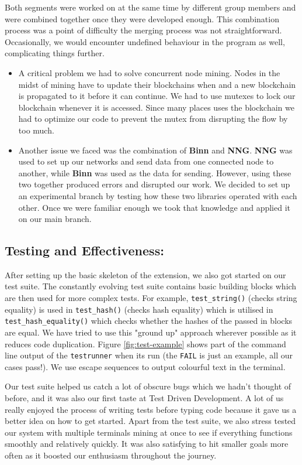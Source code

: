 \documentclass[a4paper]{article}
\begin{document}
Both segments were worked on at the same time by different group members and were combined together once they were developed enough. This combination process was a point of difficulty the merging process was not straightforward. Occasionally, we would encounter undefined behaviour in the program as well, complicating things further.
\begin{itemize}

\item A critical problem we had to solve concurrent node mining. Nodes in the midst of mining have to update their blockchains when and a new blockchain is propagated to it before it can continue. We had to use mutexes to lock our blockchain whenever it is accessed. Since many places uses the blockchain we had to optimize our code to prevent the mutex from disrupting the flow by too much.

\item Another issue we faced was the combination of \textbf{Binn} and \textbf{NNG}. \textbf{NNG} was used to set up our networks and send data from one connected node to another, while \textbf{Binn} was used as the data for sending. However, using these two together produced errors and disrupted our work. We decided to set up an experimental branch by testing how these two libraries operated with each other. Once we were familiar enough we took that knowledge and applied it on our main branch.
\end{itemize}
\subsection{Testing and Effectiveness:}
After setting up the basic skeleton of the extension, we also got started on our test suite. The constantly evolving test suite contains basic building blocks which are then used for more complex tests. For example, \verb|test_string()| (checks string equality) is used in \verb|test_hash()| (checks hash equality) which is utilised in \verb|test_hash_equality()| which checks whether the hashes of the passed in blocks are equal. We have tried to use this "ground up" approach wherever possible as it reduces code duplication. Figure \ref{fig:test-example} shows part of the command line output of the \verb|testrunner| when its run (the \texttt{\textcolor{BOLDRED}{FAIL}} is just an example, all our cases pass!). We use escape sequences to output colourful text in the terminal.

Our test suite helped us catch a lot of obscure bugs which we hadn't thought of before, and it was also our first taste at Test Driven Development. A lot of us really enjoyed the process of writing tests before typing code because it gave us a better idea on how to get started. Apart from the test suite, we also stress tested our system with multiple terminals mining at once to see if everything functions smoothly and relatively quickly. It was also satisfying to hit smaller goals more often as it boosted our enthusiasm throughout the journey.
\end{document}
